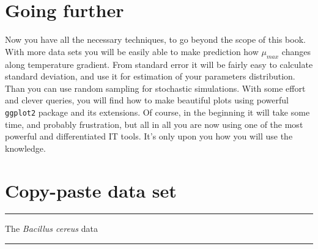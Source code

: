 \documentclass[]{book}
\theoremstyle{definition}
\theoremstyle{definition}
\theoremstyle{definition}
\theoremstyle{remark}
\begin{document}
\section{Going further}\label{going-further}

Now you have all the necessary techniques, to go beyond the scope of
this book. With more data sets you will be easily able to make
prediction how \(\mu_{max}\) changes along temperature gradient. From
standard error it will be fairly easy to calculate standard deviation,
and use it for estimation of your parameters distribution. Than you can
use random sampling for stochastic simulations. With some effort and
clever queries, you will find how to make beautiful plots using powerful
\texttt{ggplot2} package and its extensions. Of course, in the beginning
it will take some time, and probably frustration, but all in all you are
now using one of the most powerful and differentiated IT tools. It's
only upon you how you will use the knowledge.

\section{Copy-paste data set}\label{copy-paste-data-set}

\begin{center}\rule{0.5\linewidth}{\linethickness}\end{center}

\begin{center}
\begingroup\Large
The \textit{Bacillus cereus} data
\endgroup
\end{center}

\begin{center}\rule{0.5\linewidth}{\linethickness}\end{center}
\end{document}
